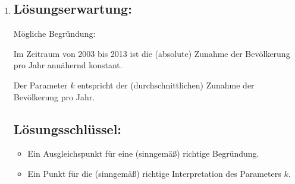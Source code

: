 \begin{langesbeispiel}
{\begin{enumerate}
\item \subsection{Lösungserwartung:}
			
Mögliche Begründung:

Im Zeitraum von 2003 bis 2013 ist die (absolute) Zunahme der Bevölkerung pro Jahr annähernd konstant.

Der Parameter $k$ entspricht der (durchschnittlichen) Zunahme der Bevölkerung pro Jahr.

	\subsection{Lösungsschlüssel:}
	
\begin{itemize}
	\item Ein Ausgleichspunkt für eine (sinngemäß) richtige Begründung.
	\item Ein Punkt für die (sinngemäß) richtige Interpretation des Parameters $k$.
\end{itemize}
\end{enumerate}}
		\end{langesbeispiel}